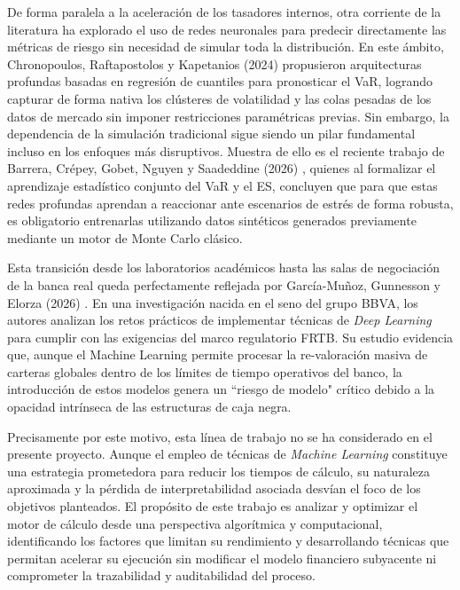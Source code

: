 \documentclass[11pt]{article}
\begin{document}
De forma paralela a la aceleración de los tasadores internos, otra corriente de la literatura ha explorado el uso de redes neuronales para predecir directamente las métricas de riesgo sin necesidad de simular toda la distribución. En este ámbito, Chronopoulos, Raftapostolos y Kapetanios (2024) \cite{chronopoulos2024forecasting} propusieron arquitecturas profundas basadas en regresión de cuantiles para pronosticar el VaR, logrando capturar de forma nativa los clústeres de volatilidad y las colas pesadas de los datos de mercado sin imponer restricciones paramétricas previas. Sin embargo, la dependencia de la simulación tradicional sigue siendo un pilar fundamental incluso en los enfoques más disruptivos. Muestra de ello es el reciente trabajo de Barrera, Crépey, Gobet, Nguyen y Saadeddine (2026) \cite{barrera2026statistical}, quienes al formalizar el aprendizaje estadístico conjunto del VaR y el ES, concluyen que para que estas redes profundas aprendan a reaccionar ante escenarios de estrés de forma robusta, es obligatorio entrenarlas utilizando datos sintéticos generados previamente mediante un motor de Monte Carlo clásico.

Esta transición desde los laboratorios académicos hasta las salas de negociación de la banca real queda perfectamente reflejada por García-Muñoz, Gunnesson y Elorza (2026) \cite{garcia2026deep}. En una investigación nacida en el seno del grupo BBVA, los autores analizan los retos prácticos de implementar técnicas de \textit{Deep Learning} para cumplir con las exigencias del marco regulatorio FRTB. Su estudio evidencia que, aunque el Machine Learning permite procesar la re-valoración masiva de carteras globales dentro de los límites de tiempo operativos del banco, la introducción de estos modelos genera un ``riesgo de modelo" crítico debido a la opacidad intrínseca de las estructuras de caja negra.

Precisamente por este motivo, esta línea de trabajo no se ha considerado en el presente proyecto. Aunque el empleo de técnicas de \textit{Machine Learning} constituye una estrategia prometedora para reducir los tiempos de cálculo, su naturaleza aproximada y la pérdida de interpretabilidad asociada desvían el foco de los objetivos planteados. El propósito de este trabajo es analizar y optimizar el motor de cálculo desde una perspectiva algorítmica y computacional, identificando los factores que limitan su rendimiento y desarrollando técnicas que permitan acelerar su ejecución sin modificar el modelo financiero subyacente ni comprometer la trazabilidad y auditabilidad del proceso.
\end{document}
